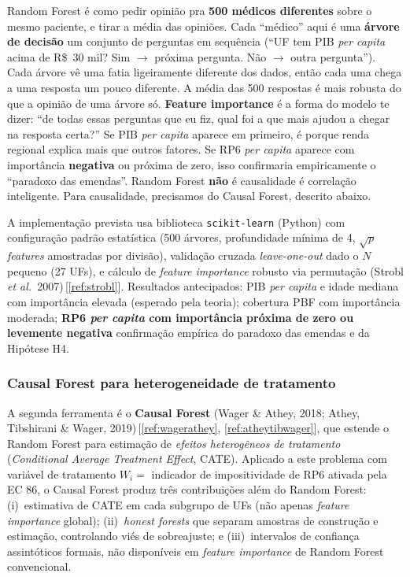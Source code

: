 \documentclass[12pt,a4paper,oneside]{article}
\begin{document}
\begin{tcolorbox}[colback=green!4,colframe=green!50!black,
                  sharp corners,boxrule=0.4pt,
                  title=\textbf{Em linguagem simples: o que é
                  Random Forest?},fonttitle=\small\bfseries]
\small
Random Forest é como pedir opinião pra \textbf{500 médicos
diferentes} sobre o mesmo paciente, e tirar a média das opiniões.
Cada ``médico'' aqui é uma \textbf{árvore de decisão}
\textemdash{} um conjunto de perguntas em sequência (``UF tem PIB
\textit{per capita} acima de R\$~30 mil? Sim $\to$ próxima
pergunta. Não $\to$ outra pergunta''). Cada árvore vê uma fatia
ligeiramente diferente dos dados, então cada uma chega a uma
resposta um pouco diferente. A média das 500 respostas é mais
robusta do que a opinião de uma árvore só. \textbf{Feature
importance} é a forma do modelo te dizer: ``de todas essas
perguntas que eu fiz, qual foi a que mais ajudou a chegar na
resposta certa?'' Se PIB \textit{per capita} aparece em primeiro,
é porque renda regional explica mais que outros fatores. Se RP6
\textit{per capita} aparece com importância \textbf{negativa} ou
próxima de zero, isso confirmaria empiricamente o ``paradoxo
das emendas''. Random Forest \textbf{não} é causalidade
\textemdash{} é correlação inteligente. Para causalidade,
precisamos do Causal Forest, descrito abaixo.
\end{tcolorbox}

A implementação prevista usa biblioteca \texttt{scikit-learn}
(Python) com configuração padrão estatística (500 árvores,
profundidade mínima de 4, $\sqrt{p}$ \textit{features} amostradas
por divisão), validação cruzada \textit{leave-one-out} dado o
$N$ pequeno (27 UFs), e cálculo de \textit{feature importance}
robusto via permutação (Strobl \textit{et al.}\
2007)\,[\ref{ref:strobl}]. Resultados antecipados: PIB
\textit{per capita} e idade mediana com importância elevada
(esperado pela teoria); cobertura PBF com importância moderada;
\textbf{RP6 \textit{per capita} com importância próxima de zero
ou levemente negativa} \textemdash{} confirmação empírica do
paradoxo das emendas e da Hipótese H4.

\subsubsection{Causal Forest para heterogeneidade de tratamento}

A segunda ferramenta é o \textbf{Causal Forest} (Wager \&
Athey, 2018; Athey, Tibshirani \& Wager,
2019)\,[\ref{ref:wagerathey}, \ref{ref:atheytibwager}], que estende
o Random Forest para estimação de \textit{efeitos heterogêneos
de tratamento} (\textit{Conditional Average Treatment Effect},
CATE). Aplicado a este problema com variável de tratamento
$W_i = $ indicador de impositividade de RP6 ativada pela EC 86,
o Causal Forest produz três contribuições além do Random Forest:
(i)~estimativa de CATE em cada subgrupo de UFs (não apenas
\textit{feature importance} global); (ii)~\textit{honest
forests} que separam amostras de construção e estimação,
controlando viés de sobreajuste; e (iii)~intervalos de confiança
assintóticos formais, não disponíveis em \textit{feature
importance} de Random Forest convencional.
\end{document}

